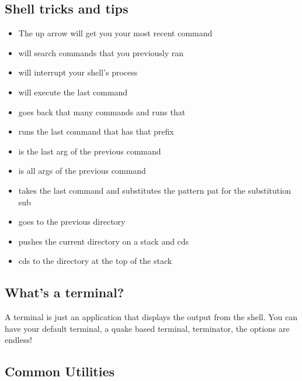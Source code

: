 \subsection{Shell tricks and tips}

\begin{itemize}
\item The up arrow will get you your most recent command
\item {} will search commands that you previously ran
\item {} will interrupt your shell's process
\item \keyword{!!} will execute the last command
\item {} goes back that many commands and runs that
\item {} runs the last command that has that prefix
\item \keyword{!\$} is the last arg of the previous command
\item \keyword{!*} is all args of the previous command
\item {} takes the last command and substitutes the pattern pat for the substitution sub
\item {} goes to the previous directory
\item {} pushes the current directory on a stack and cds
\item {} cds to the directory at the top of the stack
\end{itemize}

\subsection{What's a terminal?}

A terminal is just an application that displays the output from the shell. You can have your default terminal, a quake based terminal, terminator, the options are endless!

\subsection{Common Utilities}

